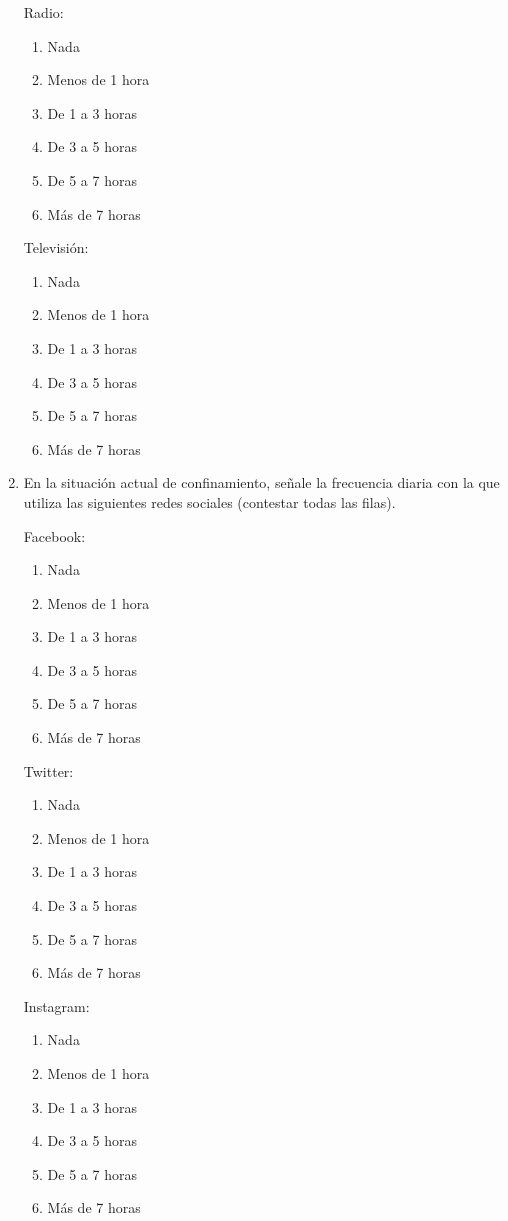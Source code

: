 \documentclass[spanish]{textolivre}
\begin{document}
\begin{enumerate}
    Radio:
    \begin{enumerate}
        \item Nada
        \item Menos de 1 hora
        \item De 1 a 3 horas
        \item De 3 a 5 horas
        \item De 5 a 7 horas
        \item Más de 7 horas
    \end{enumerate}
    
    Televisión:
    \begin{enumerate}
        \item Nada
        \item Menos de 1 hora
        \item De 1 a 3 horas
        \item De 3 a 5 horas
        \item De 5 a 7 horas
        \item Más de 7 horas
    \end{enumerate}
    \item En la situación actual de confinamiento, señale la frecuencia diaria con la que utiliza las siguientes redes sociales (contestar todas las filas).
    
    Facebook:
    \begin{enumerate}
        \item Nada
        \item Menos de 1 hora
        \item De 1 a 3 horas
        \item De 3 a 5 horas
        \item De 5 a 7 horas
        \item Más de 7 horas
    \end{enumerate}
    
    Twitter:
    \begin{enumerate}
        \item Nada
        \item Menos de 1 hora
        \item De 1 a 3 horas
        \item De 3 a 5 horas
        \item De 5 a 7 horas
        \item Más de 7 horas
    \end{enumerate}
        
    Instagram:
    \begin{enumerate}
        \item Nada
        \item Menos de 1 hora
        \item De 1 a 3 horas
        \item De 3 a 5 horas
        \item De 5 a 7 horas
        \item Más de 7 horas
    \end{enumerate}
    

\end{enumerate}
\end{document}
